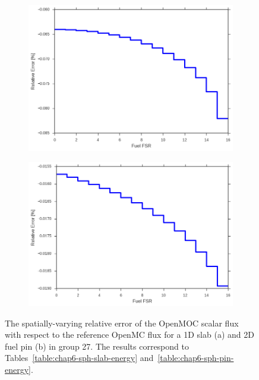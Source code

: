 \begin{figure}[h!]
\begin{subfigure}{.9\textwidth}
  \centering
  \includegraphics[width=0.9\linewidth]{figures/sph/slab/rel-err-fuel-fsrs}
  \caption{}
\end{subfigure}
\begin{subfigure}{.9\textwidth}
  \centering
  \includegraphics[width=0.9\linewidth]{figures/sph/pin-cell/rel-err-fuel-fsrs}
  \caption{}
\end{subfigure}
\caption[Flux relative error by FSR with SPH]{The spatially-varying relative error of the OpenMOC scalar flux with respect to the reference OpenMC flux for a 1D slab (a) and 2D fuel pin (b) in group 27. The results correspond to Tables~\ref{table:chap6-sph-slab-energy} and~\ref{table:chap6-sph-pin-energy}.}
\label{fig:chap6-rel-err-space}
\end{figure}

